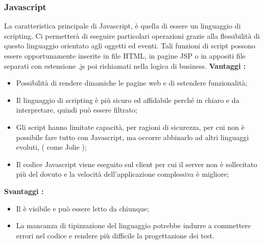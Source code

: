 {		\subsubsection{Javascript}{
			La caratteristica principale di Javascript, è quella di essere un linguaggio di scripting. Ci permetterà di eseguire particolari operazioni grazie alla flessibilità di questo linguaggio orientato agli oggetti ed eventi. Tali funzioni di script possono essere opportunamente inserite in file HTML, in pagine JSP o in appositi file separati con estensione .js poi richiamati nella logica di business.
			\textbf{Vantaggi :}
			\begin{itemize}\itemsep1pt
				\item Possibilità di rendere dinamiche le pagine web e di estendere funzionalità;
				\item Il linguaggio di scripting è più sicuro ed affidabile perché in chiaro e da interpretare, quindi può essere filtrato;
				\item Gli script hanno limitate capacità, per ragioni di sicurezza, per cui non è possibile fare tutto con Javascript, ma occorre abbinarlo ad altri linguaggi evoluti, ( come Jolie );
				\item Il codice Javascript viene eseguito sul client per cui il server non è sollecitato più del dovuto e la velocità dell'applicazione complessiva è migliore;
			\end{itemize}
			\textbf{Svantaggi :}
			\begin{itemize}\itemsep1pt
				\item Il è visibile e può essere letto da chiunque;
				\item La mancanza di tipizzazione del linguaggio potrebbe indurre a commettere errori nel codice e rendere più difficile la progettazione dei test.
			\end{itemize}
		}
}
